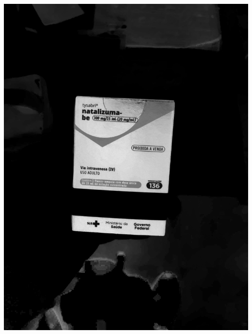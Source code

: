 \begin{frame}
	\centering
	\begin{columns}
		\begin{column}{0.24\textwidth}\centering
			\includegraphics[height=0.35\textheight]{../pictures/tysabri_cmyk_c_only.jpg}
			\\\vspace{\floatsep}

\end{column}
\end{columns}
\end{frame}
